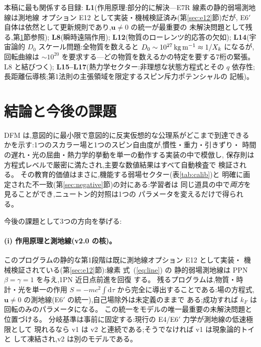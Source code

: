 \documentclass[a4paper,10pt,twocolumn]{ltjsarticle}
\newcommand{\ud}{\mathrm{d}}
\newcommand{\vect}[1]{\bm{#1}}
\newcommand{\Kt}{X_k}
\newcommand{\Dz}{D_0}
\begin{document}
本稿に最も関係する目録:
{\bf L1}(作用原理:部分的に解決---E7R 線素の静的弱場測地線は測地線
オプション E12 として実装・機械検証済み(第\ref{sec:e12}節)だが,
E6$'$ 自体は依然として更新規則であり,$\vect{u}\ne0$ の統一が最重要の
未解決問題として残る,第\ref{sec:conclusion}節参照);
{\bf L8}(瞬時遠隔作用);
{\bf L12}(物質のローレンツ的応答の欠如);
{\bf L14}(宇宙論的 $\Dz$ スケール問題:全物質を数えると
$\Dz \sim 10^{27}\,{\rm kg\,m^{-1}} \approx 1/\Kt$ になるが,回転曲線は
$\sim10^{20}$ を要求する---どの物質を数えるかの特定を要する7桁の緊張。
L8 と結びつく);
{\bf L15--L17}(熱力学セクター:非理想な状態方程式とその $q$ 依存性;
長距離伝導核;第1法則の主張領域を限定するスピン斥力ポテンシャルの
記帳)。

\section{結論と今後の課題}
\label{sec:conclusion}

DFM は,意図的に最小限で意図的に反実仮想的な公理系がどこまで到達できる
かを示す:1つのスカラー場と1つのスピン自由度が,慣性・重力・引きずり・
時間の遅れ・光の屈曲・熱力学的挙動を単一の動作する実装の中で模倣し,
保存則は方程式レベルで厳密に満たされ,主要な数値結果はすべて自動検査で
検証される。
その教育的価値はまさに,機能する弱場セクター(表\ref{tab:calib})と
明確に画定された不一致(第\ref{sec:negative}節)の対にある:学習者は
同じ道具の中で\emph{両方}を見ることができ,ニュートン的対照は1つの
パラメータを変えるだけで得られる。

今後の課題として3つの方向を挙げる:

\paragraph*{(i) 作用原理と測地線(v2.0 の核)。}
このプログラムの静的な第1段階は既に測地線オプション E12 として実装・
機械検証されている(第\ref{sec:e12}節):線素 式~(\ref{eq:line}) の
静的弱場測地線は PPN $\beta = \gamma = 1$ を与え,1PN 近日点前進を回復
する。
残るプログラムは,物質・時計・光を単一の作用
$S = -mc^2\!\int\!\ud\tau$ から完全に導出することである:場の方程式,
$\vect{u}\ne0$ の測地線(E6$'$ の統一),自己場除外は未定義のままで
ある;成功すれば $k_F$ は回転のみのパラメータになる。
この統一をモデルの唯一最重要の未解決問題と位置づける。
分岐基準は事前に固定する:現行の E4/E6$'$ 力学が測地線の低速極限として
現れるなら v1 は v2 と連続である;そうでなければ v1 は現象論的トイと
して凍結され,v2 は別のモデルである。
\end{document}
